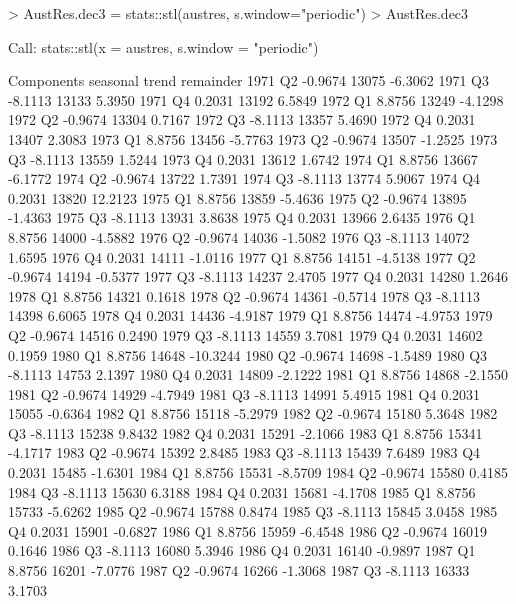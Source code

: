 \begin{Schunk}
\begin{Sinput}
> AustRes.dec3 = stats::stl(austres, s.window="periodic")
> AustRes.dec3
\end{Sinput}
\begin{Soutput}
 Call:
 stats::stl(x = austres, s.window = "periodic")

Components
        seasonal trend remainder
1971 Q2  -0.9674 13075   -6.3062
1971 Q3  -8.1113 13133    5.3950
1971 Q4   0.2031 13192    6.5849
1972 Q1   8.8756 13249   -4.1298
1972 Q2  -0.9674 13304    0.7167
1972 Q3  -8.1113 13357    5.4690
1972 Q4   0.2031 13407    2.3083
1973 Q1   8.8756 13456   -5.7763
1973 Q2  -0.9674 13507   -1.2525
1973 Q3  -8.1113 13559    1.5244
1973 Q4   0.2031 13612    1.6742
1974 Q1   8.8756 13667   -6.1772
1974 Q2  -0.9674 13722    1.7391
1974 Q3  -8.1113 13774    5.9067
1974 Q4   0.2031 13820   12.2123
1975 Q1   8.8756 13859   -5.4636
1975 Q2  -0.9674 13895   -1.4363
1975 Q3  -8.1113 13931    3.8638
1975 Q4   0.2031 13966    2.6435
1976 Q1   8.8756 14000   -4.5882
1976 Q2  -0.9674 14036   -1.5082
1976 Q3  -8.1113 14072    1.6595
1976 Q4   0.2031 14111   -1.0116
1977 Q1   8.8756 14151   -4.5138
1977 Q2  -0.9674 14194   -0.5377
1977 Q3  -8.1113 14237    2.4705
1977 Q4   0.2031 14280    1.2646
1978 Q1   8.8756 14321    0.1618
1978 Q2  -0.9674 14361   -0.5714
1978 Q3  -8.1113 14398    6.6065
1978 Q4   0.2031 14436   -4.9187
1979 Q1   8.8756 14474   -4.9753
1979 Q2  -0.9674 14516    0.2490
1979 Q3  -8.1113 14559    3.7081
1979 Q4   0.2031 14602    0.1959
1980 Q1   8.8756 14648  -10.3244
1980 Q2  -0.9674 14698   -1.5489
1980 Q3  -8.1113 14753    2.1397
1980 Q4   0.2031 14809   -2.1222
1981 Q1   8.8756 14868   -2.1550
1981 Q2  -0.9674 14929   -4.7949
1981 Q3  -8.1113 14991    5.4915
1981 Q4   0.2031 15055   -0.6364
1982 Q1   8.8756 15118   -5.2979
1982 Q2  -0.9674 15180    5.3648
1982 Q3  -8.1113 15238    9.8432
1982 Q4   0.2031 15291   -2.1066
1983 Q1   8.8756 15341   -4.1717
1983 Q2  -0.9674 15392    2.8485
1983 Q3  -8.1113 15439    7.6489
1983 Q4   0.2031 15485   -1.6301
1984 Q1   8.8756 15531   -8.5709
1984 Q2  -0.9674 15580    0.4185
1984 Q3  -8.1113 15630    6.3188
1984 Q4   0.2031 15681   -4.1708
1985 Q1   8.8756 15733   -5.6262
1985 Q2  -0.9674 15788    0.8474
1985 Q3  -8.1113 15845    3.0458
1985 Q4   0.2031 15901   -0.6827
1986 Q1   8.8756 15959   -6.4548
1986 Q2  -0.9674 16019    0.1646
1986 Q3  -8.1113 16080    5.3946
1986 Q4   0.2031 16140   -0.9897
1987 Q1   8.8756 16201   -7.0776
1987 Q2  -0.9674 16266   -1.3068
1987 Q3  -8.1113 16333    3.1703

\end{Soutput}
\end{Schunk}
